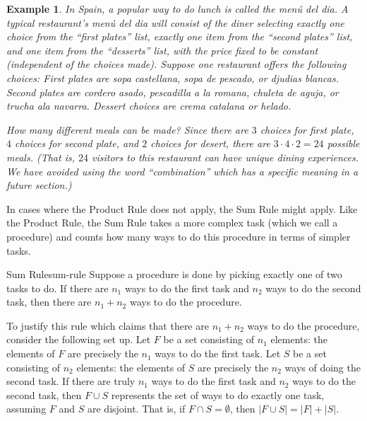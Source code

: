 \documentclass{book}
\newcounter{ekcounter}%
\theoremstyle{ekimcustom}
\newtheorem{example}[ekcounter]{Example}
\begin{document}
\begin{example}\label{example:menu-del-dia}
In Spain, a popular way to do lunch is called the men\'u del dia. A typical restaurant's men\'u del dia will consist of the diner selecting exactly one choice from the ``first plates'' list, exactly one item from the ``second plates'' list, and one item from the ``desserts'' list, with the price fixed to be constant (independent of the choices made). Suppose one restaurant offers the following choices:
First plates are sopa castellana, sopa de pescado, or djudias blancas.
Second plates are cordero asado, pescadilla a la romana, chuleta de aguja, or trucha ala navarra.
Dessert choices are crema catalana or helado.

How many different meals can be made? Since there are $3$ choices for first plate, $4$ choices for second plate, and $2$ choices for desert, there are $3 \cdot 4 \cdot 2 = 24$ possible meals. (That is, $24$ visitors to this restaurant can have unique dining experiences. We have avoided using the word ``combination'' which has a specific meaning in a future section.)
\end{example}

In cases where the Product Rule does not apply, the Sum Rule might apply. Like the Product Rule, the Sum Rule takes a more complex task (which we call a procedure) and counts how many ways to do this procedure in terms of simpler tasks.
\begin{bmethod}{Sum Rule}{sum-rule}
Suppose a procedure is done by picking exactly one of two tasks to do. If there are $n_1$ ways to do the first task and $n_2$ ways to do the second task, then there are $n_1+n_2$ ways to do the procedure.
\end{bmethod}
To justify this rule which claims that there are $n_1+n_2$ ways to do the procedure, consider the following set up. Let $F$ be a set consisting of $n_1$ elements: the elements of $F$ are precisely the $n_1$ ways to do the first task. Let $S$ be a set consisting of $n_2$ elements: the elements of $S$ are precisely the $n_2$ ways of doing the second task. If there are truly $n_1$ ways to do the first task and $n_2$ ways to do the second task, then $F \cup S$ represents the set of ways to do exactly one task, assuming $F$ and $S$ are disjoint. That is, if $F \cap S = \emptyset$, then $|F \cup S| = |F| + |S|$.
\end{document}
